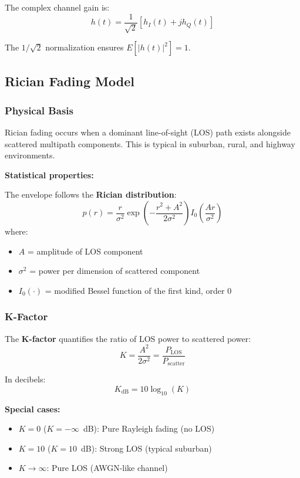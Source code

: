 The complex channel gain is:
\begin{equation}
h(t) = \frac{1}{\sqrt{2}}\left[h_I(t) + jh_Q(t)\right]
\end{equation}

The $1/\sqrt{2}$ normalization ensures $E[|h(t)|^2] = 1$.

\subsection{Rician Fading Model}

\subsubsection{Physical Basis}

Rician fading occurs when a dominant line-of-sight (LOS) path exists alongside scattered multipath components. This is typical in suburban, rural, and highway environments.

\textbf{Statistical properties:}

The envelope follows the \textbf{Rician distribution}:
\begin{equation}
p(r) = \frac{r}{\sigma^2} \exp\left(-\frac{r^2 + A^2}{2\sigma^2}\right) I_0\left(\frac{Ar}{\sigma^2}\right)
\end{equation}
where:
\begin{itemize}
\item $A$ = amplitude of LOS component
\item $\sigma^2$ = power per dimension of scattered component
\item $I_0(\cdot)$ = modified Bessel function of the first kind, order 0
\end{itemize}

\subsubsection{K-Factor}

The \textbf{K-factor} quantifies the ratio of LOS power to scattered power:
\begin{equation}
K = \frac{A^2}{2\sigma^2} = \frac{P_{\text{LOS}}}{P_{\text{scatter}}}
\end{equation}

In decibels:
\begin{equation}
K_{\text{dB}} = 10\log_{10}(K)
\end{equation}

\textbf{Special cases:}
\begin{itemize}
\item $K = 0$ ($K = -\infty$~dB): Pure Rayleigh fading (no LOS)
\item $K = 10$ ($K = 10$~dB): Strong LOS (typical suburban)
\item $K \to \infty$: Pure LOS (AWGN-like channel)
\end{itemize}

